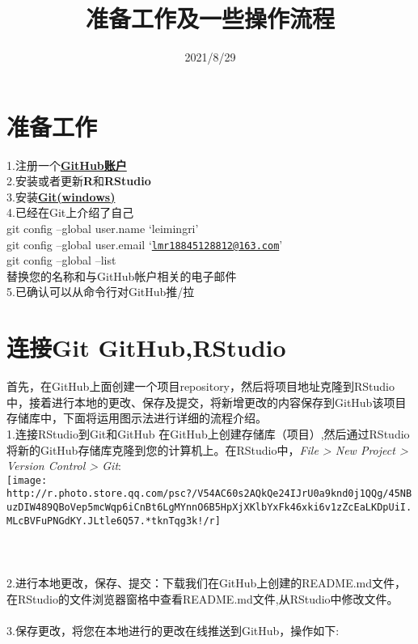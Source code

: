 \documentclass[
]{ctexart}
\title{准备工作及一些操作流程}
\author{}
\date{\vspace{-2.5em}2021/8/29}
\begin{document}
\maketitle

\hypertarget{ux51c6ux5907ux5de5ux4f5c}{%
\section{准备工作}\label{ux51c6ux5907ux5de5ux4f5c}}

1.注册一个\href{https://github.com}{\textbf{GitHub账户}}\\
2.安装或者更新\textbf{R}和\textbf{RStudio}\\
3.安装\href{https://gitforwindows.org/}{\textbf{Git(windows)}}\\
4.已经在Git上介绍了自己\\
git config --global user.name `leimingri'\\
git config --global user.email
`\href{mailto:lmr18845128812@163.com}{\nolinkurl{lmr18845128812@163.com}}'\\
git config --global --list\\
替换您的名称和与GitHub帐户相关的电子邮件\\
5.已确认可以从命令行对GitHub推/拉

\hypertarget{ux8fdeux63a5git-githubrstudio}{%
\section{连接Git GitHub,RStudio}\label{ux8fdeux63a5git-githubrstudio}}

首先，在GitHub上面创建一个项目repository，然后将项目地址克隆到RStudio中，接着进行本地的更改、保存及提交，将新增更改的内容保存到GitHub该项目存储库中，下面将运用图示法进行详细的流程介绍。\\
1.连接RStudio到Git和GitHub
在GitHub上创建存储库（项目）,然后通过RStudio将新的GitHub存储库克隆到您的计算机上。在RStudio中，\emph{File
\textgreater{} New Project \textgreater{} Version Control \textgreater{}
Git}:\\
\texttt{[image: http://r.photo.store.qq.com/psc?/V54AC60s2AQkQe24IJrU0a9knd0j1QQg/45NBuzDIW489QBoVep5mcWqp6iCnBt6LgMYnnO6B5HpXjXKlbYxFk46xki6v1zZcEaLKDpUiI.MLcBVFuPNGdKY.JLtle6Q57.*tknTqg3k!/r]}\\
~\\
~\\
~\\

2.进行本地更改，保存、提交：下载我们在GitHub上创建的README.md文件，在RStudio的文件浏览器窗格中查看README.md文件,从RStudio中修改文件。\\
~\\
3.保存更改，将您在本地进行的更改在线推送到GitHub，操作如下:
\end{document}
